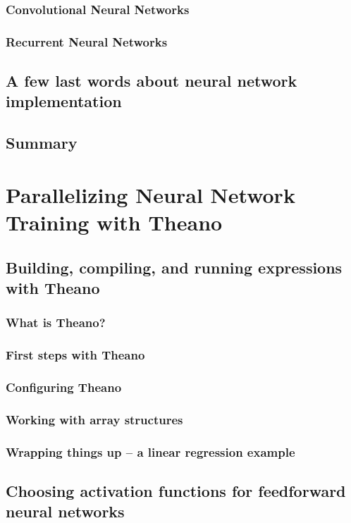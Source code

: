 \documentclass[letterpaper]{report}
\begin{document}
\subsection{Convolutional Neural Networks}
\subsection{Recurrent Neural Networks}
\section{A few last words about neural network implementation}
\section{Summary}




\chapter{Parallelizing Neural Network Training with Theano}

\section{Building, compiling, and running expressions with Theano}
\subsection{What is Theano?}
\subsection{First steps with Theano}
\subsection{Configuring Theano}
\subsection{Working with array structures}
\subsection{Wrapping things up -- a linear regression example}
\section{Choosing activation functions for feedforward neural networks}
\end{document}
